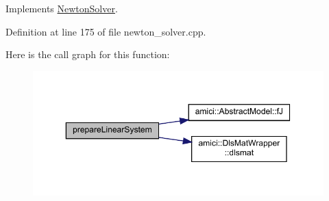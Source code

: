 Implements \mbox{\hyperlink{classamici_1_1_newton_solver_a4aed46b0343374f171f9b4b51fa009e7}{Newton\+Solver}}.



Definition at line 175 of file newton\+\_\+solver.\+cpp.

Here is the call graph for this function\+:
\nopagebreak
\begin{figure}[H]
\begin{center}
\leavevmode
\includegraphics[width=350pt]{classamici_1_1_newton_solver_dense_a0b900656d018299b08d0f027e95bd347_cgraph}
\end{center}
\end{figure}
